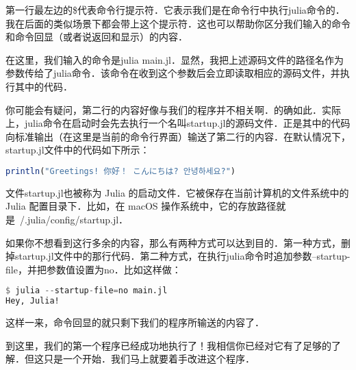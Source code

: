 第一行最左边的\$代表命令行提示符．它表示我们是在命令行中执行julia命令的．我在后面的类似场景下都会带上这个提示符．这也可以帮助你区分我们输入的命令和命令回显（或者说返回和显示）的内容．

在这里，我们输入的命令是julia main.jl．显然，我把上述源码文件的路径名作为参数传给了julia命令．该命令在收到这个参数后会立即读取相应的源码文件，并执行其中的代码．

你可能会有疑问，第二行的内容好像与我们的程序并不相关啊．的确如此．实际上，julia命令在启动时会先去执行一个名叫startup.jl的源码文件．正是其中的代码向标准输出（在这里是当前的命令行界面）输送了第二行的内容．在默认情况下，startup.jl文件中的代码如下所示：
\begin{lstlisting}[language=julia]
println("Greetings! 你好！ こんにちは? 안녕하세요?")
\end{lstlisting}

文件startup.jl也被称为 Julia 的启动文件．它被保存在当前计算机的文件系统中的 Julia 配置目录下．比如，在 macOS 操作系统中，它的存放路径就是~/.julia/config/startup.jl．

如果你不想看到这行多余的内容，那么有两种方式可以达到目的．第一种方式，删掉startup.jl文件中的那行代码．第二种方式，在执行julia命令时追加参数--startup-file，并把参数值设置为no．比如这样做：
\begin{lstlisting}[language=julia]
$ julia --startup-file=no main.jl
Hey, Julia!
\end{lstlisting}
这样一来，命令回显的就只剩下我们的程序所输送的内容了．

到这里，我们的第一个程序已经成功地执行了！我相信你已经对它有了足够的了解．但这只是一个开始．我们马上就要着手改进这个程序．